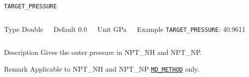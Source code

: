 \begin{frame}[allowframebreaks]{\texttt{TARGET\_PRESSURE}} \label{TARGET_PRESSURE}
\vspace*{-12pt}
\begin{columns}
\begin{block}{Type}
Double
\end{block}

\begin{block}{Default}
0.0
\end{block}

\begin{block}{Unit}
GPa
\end{block}

\begin{block}{Example}
\texttt{TARGET\_PRESSURE}: 40.9611
\end{block}
\end{columns}

\begin{block}{Description}
Gives the outer pressure in NPT\_NH and NPT\_NP.
\end{block}

\begin{block}{Remark}
Applicable to NPT\_NH and NPT\_NP \hyperlink{MD_METHOD}{\texttt{MD\_METHOD}} only.
\end{block}

\end{frame}



